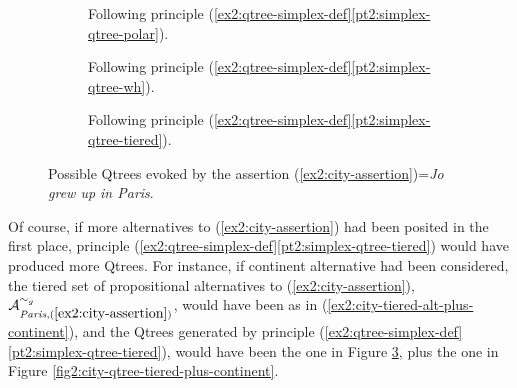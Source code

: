 \begin{figure}[H]
	\centering
	\begin{subfigure}[t]{.23\linewidth}
		\centering
		\caption{Following principle (\ref{ex2:qtree-simplex-def}\ref{pt2:simplex-qtree-polar}).}\label{fig2:city-qtree-polar}
	\end{subfigure}
	\hfill
	\begin{subfigure}[t]{.33\linewidth}
		\centering		{}
		\caption{Following principle (\ref{ex2:qtree-simplex-def}\ref{pt2:simplex-qtree-wh}).}\label{fig2:city-qtree-wh}
	\end{subfigure}
	\hfill
	\begin{subfigure}[t]{.38\linewidth}
		\centering{}
		\caption{Following principle (\ref{ex2:qtree-simplex-def}\ref{pt2:simplex-qtree-tiered}).}\label{fig2:city-qtree-tiered}
	\end{subfigure}
	\caption{Possible Qtrees evoked by the assertion (\ref{ex2:city-assertion})=\textit{Jo grew up in Paris}.}\label{fig2:city-qtrees}
\end{figure}

Of course, if more alternatives to (\ref{ex2:city-assertion}) had been posited in the first place, principle (\ref{ex2:qtree-simplex-def}\ref{pt2:simplex-qtree-tiered}) would have produced more Qtrees. For instance, if continent alternative had been considered, the tiered set of propositional alternatives to (\ref{ex2:city-assertion}), $\mathcal{A}_{\textit{Paris}, (\ref{ex2:city-assertion})}^{\sim_g}$, would have been as in (\ref{ex2:city-tiered-alt-plus-continent}), and the Qtrees generated by principle (\ref{ex2:qtree-simplex-def}\ref{pt2:simplex-qtree-tiered}), would have been the one in Figure \ref{fig2:city-qtree-tiered}, plus the one in Figure \ref{fig2:city-qtree-tiered-plus-continent}.

